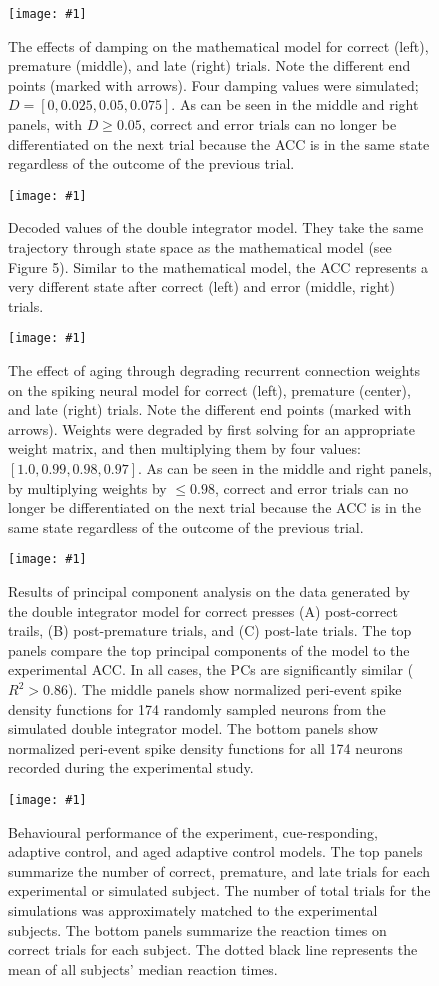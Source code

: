 \documentclass[11pt]{article}
\newcommand{\scalefigone}[3]{
  \begin{figure}[ht!]
    \centering
    \texttt{[image: \#1]}
    \caption{#3}
    \label{#1}
  \end{figure}}
\begin{document}
\scalefigone{fig6}{1.0}{
  The effects of damping on the mathematical
  model for correct (left), premature (middle),
  and late (right) trials.
  Note the different end points (marked with arrows).
  Four damping values were simulated;
  $D = [0, 0.025, 0.05, 0.075]$.
  As can be seen in the middle and right panels,
  with $D \ge 0.05$,
  correct and error trials can no longer
  be differentiated on the next trial
  because the ACC is in the same state
  regardless of the outcome of the previous trial.
}

\scalefigone{fig7}{1.0}{
  Decoded values of the double integrator model.
  They take the same trajectory through state
  space as the mathematical model (see Figure 5).
  Similar to the mathematical model,
  the ACC represents a very different state
  after correct (left) and error (middle, right)
  trials.
}

\scalefigone{fig8}{1.0}{
  The effect of aging through degrading recurrent connection weights
  on the spiking neural model for correct (left), premature (center),
  and late (right) trials.
  Note the different end points (marked with arrows).
  Weights were degraded by first solving for an appropriate
  weight matrix, and then multiplying them by four values:
  $[1.0, 0.99, 0.98, 0.97]$.
  As can be seen in the middle and right panels,
  by multiplying weights by $\le 0.98$,
  correct and error trials can no longer
  be differentiated on the next trial
  because the ACC is in the same state
  regardless of the outcome of the previous trial.
}

\scalefigone{fig9}{1.0}{
  Results of principal component analysis
  on the data generated by the double integrator model
  for correct presses (A) post-correct trails,
  (B) post-premature trials, and (C) post-late trials.
  The top panels compare the top principal components
  of the model to the experimental ACC.
  In all cases, the PCs are significantly similar
  ($R^2 > 0.86$).
  The middle panels show normalized
  peri-event spike density functions
  for 174 randomly sampled neurons from the
  simulated double integrator model.
  The bottom panels show normalized
  peri-event spike density functions
  for all 174 neurons recorded
  during the experimental study.
}

\scalefigone{fig10}{1.0}{
  Behavioural performance of the
  experiment, cue-responding, adaptive control,
  and aged adaptive control models.
  The top panels summarize the number of
  correct, premature, and late trials
  for each experimental or simulated subject.
  The number of total trials
  for the simulations was approximately
  matched to the experimental subjects.
  The bottom panels summarize the reaction times
  on correct trials for each subject.
  The dotted black line represents
  the mean of all subjects' median reaction times.
}
\end{document}
